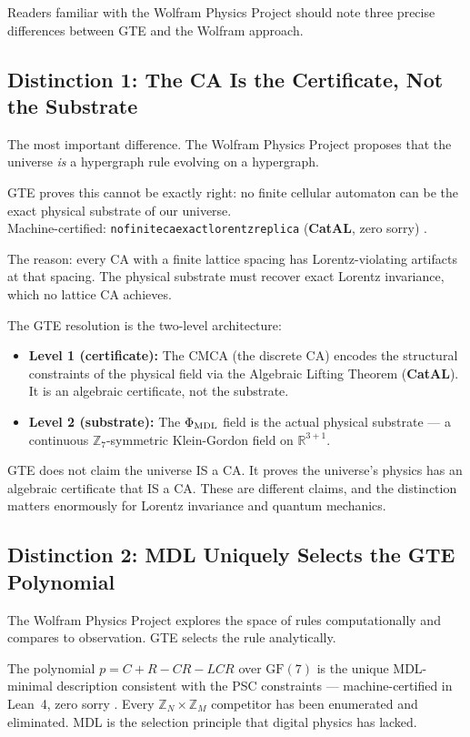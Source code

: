 \documentclass[11pt,a4paper]{article}
\newcommand{\lean}[1]{%
  \penalty-100
  \begingroup\def\_{\textunderscore\allowbreak}\texttt{#1}\endgroup}
\newcommand{\CatAL}{\textbf{CatAL}}
\newcommand{\poly}{p}
\begin{document}
Readers familiar with the Wolfram Physics Project should note three precise
differences between GTE and the Wolfram approach.

\subsection{Distinction 1: The CA Is the Certificate, Not the Substrate}

The most important difference.  The Wolfram Physics Project proposes that the
universe \emph{is} a hypergraph rule evolving on a hypergraph.

GTE proves this cannot be exactly right: no finite cellular automaton can be the
exact physical substrate of our universe.\\
Machine-certified: \lean{no\_finite\_ca\_exact\_lorentz\_replica}
(\CatAL, zero sorry) \cite{SpivackCompUniversality}.

The reason: every CA with a finite lattice spacing has Lorentz-violating
artifacts at that spacing.  The physical substrate must recover exact Lorentz
invariance, which no lattice CA achieves.

The GTE resolution is the two-level architecture:
\begin{itemize}[itemsep=3pt]
  \item \textbf{Level 1 (certificate):} The CMCA (the discrete CA) encodes the
    structural constraints of the physical field via the Algebraic Lifting
    Theorem (\CatAL).  It is an algebraic certificate, not the substrate.
  \item \textbf{Level 2 (substrate):} The $\Phi_{\rm MDL}$ field is the actual
    physical substrate — a continuous $\mathbb{Z}_7$-symmetric Klein-Gordon
    field on $\mathbb{R}^{3+1}$.
\end{itemize}
GTE does not claim the universe IS a CA.  It proves the universe's physics has an
algebraic certificate that IS a CA.  These are different claims, and the
distinction matters enormously for Lorentz invariance and quantum mechanics.

\subsection{Distinction 2: MDL Uniquely Selects the GTE Polynomial}

The Wolfram Physics Project explores the space of rules computationally and
compares to observation.  GTE selects the rule analytically.

The polynomial $\poly = C + R - CR - LCR$ over $\mathrm{GF}(7)$ is the unique
MDL-minimal description consistent with the PSC constraints — machine-certified
in Lean~4, zero sorry \cite{SpivackGTEPolynomialWolfram}.  Every
$\mathbb{Z}_N \times \mathbb{Z}_M$ competitor has been enumerated and
eliminated.  MDL is the selection principle that digital physics has lacked.
\end{document}
